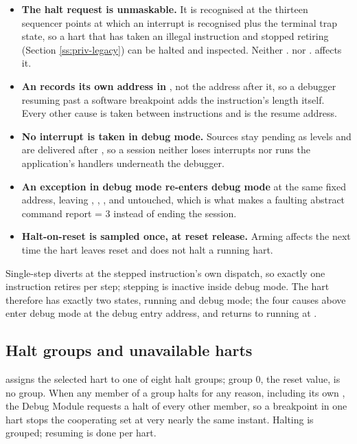 \begin{itemize}
	\item \textbf{The halt request is unmaskable.} It is recognised at the thirteen sequencer points at which an interrupt is recognised plus the terminal trap state, so a hart that has taken an illegal instruction and stopped retiring (Section \ref{ss:priv-legacy}) can be halted and inspected. Neither . nor . affects it.
	\item \textbf{An  records its own address in }, not the address after it, so a debugger resuming past a software breakpoint adds the instruction's length itself. Every other cause is taken between instructions and  is the resume address.
	\item \textbf{No interrupt is taken in debug mode.} Sources stay pending as levels and are delivered after , so a session neither loses interrupts nor runs the application's handlers underneath the debugger.
	\item \textbf{An exception in debug mode re-enters debug mode} at the same fixed address, leaving , , ,  and  untouched, which is what makes a faulting abstract command report  = 3 instead of ending the session.
	\item \textbf{Halt-on-reset is sampled once, at reset release.} Arming  affects the next time the hart leaves reset and does not halt a running hart.
\end{itemize}

Single-step diverts at the stepped instruction's own dispatch, so exactly one instruction retires per step; stepping is inactive inside debug mode. The hart therefore has exactly two states, running and debug mode; the four causes above enter debug mode at the debug entry address, and  returns to running at .

\subsection{Halt groups and unavailable harts} \label{ss:debug-groups}

 assigns the selected hart to one of eight halt groups; group 0, the reset value, is no group. When any member of a group halts for any reason, including its own , the Debug Module requests a halt of every other member, so a breakpoint in one hart stops the cooperating set at very nearly the same instant. Halting is grouped; resuming is done per hart.

